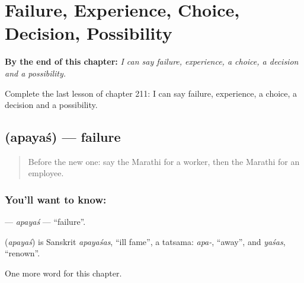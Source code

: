 
\chapter{Failure, Experience, Choice, Decision, Possibility}
\label{ch:mr-failure-experience-choice-decision-possibility}

\begin{chapteropening}
\textbf{By the end of this chapter:} \emph{I can say failure, experience, a choice, a decision and a possibility.}

Complete the last lesson of chapter 211: I can say failure, experience, a choice, a decision and a possibility.
\end{chapteropening}

\section[\texorpdfstring{\mr{अपयश} (apayaś)}{अपयश (apayaś)}]{ (apayaś) — failure}

\label{lesson:MR-C211-apayas}



\begin{quote}
Before the new one: say the Marathi for a worker, then the Marathi for an employee.
\end{quote}

\subsection*{You'll want to know: }
\textbf{} — \emph{apayaś} — \textquotedblleft{}failure\textquotedblright{}.

\begin{cousinweb}
\textbf{} (\emph{apayaś}) is Sanskrit \emph{apayaśas}, \textquotedblleft{}ill fame\textquotedblright{}, a tatsama: \emph{apa-}, \textquotedblleft{}away\textquotedblright{}, and \emph{yaśas}, \textquotedblleft{}renown\textquotedblright{}.
\end{cousinweb}

\begin{grammarlens}[title={What you've built}]
One more word for this chapter.
\end{grammarlens}

